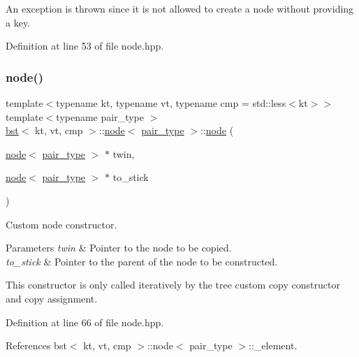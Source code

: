 An exception is thrown since it is not allowed to create a node without providing a key. 

Definition at line 53 of file node.\+hpp.

\mbox{\label{structbst_1_1node_a87b48a3770bbaa16830f8bbb635edd38}} 
\subsubsection{\texorpdfstring{node()}{node()}\hspace{0.1cm}{\footnotesize\ttfamily [2/5]}}
{\footnotesize\ttfamily template$<$typename kt, typename vt, typename cmp = std\+::less$<$kt$>$$>$ \\
template$<$typename pair\+\_\+type $>$ \\
\hyperlink{classbst}{bst}$<$ kt, vt, cmp $>$\+::\hyperlink{structbst_1_1node}{node}$<$ \hyperlink{classbst_a7b11cca2a3b4394915600194f741ab16}{pair\+\_\+type} $>$\+::\hyperlink{structbst_1_1node}{node} (\begin{DoxyParamCaption}\item[{\hyperlink{structbst_1_1node}{node}$<$ \hyperlink{classbst_a7b11cca2a3b4394915600194f741ab16}{pair\+\_\+type} $>$ $\ast$}]{twin,  }\item[{\hyperlink{structbst_1_1node}{node}$<$ \hyperlink{classbst_a7b11cca2a3b4394915600194f741ab16}{pair\+\_\+type} $>$ $\ast$}]{to\+\_\+stick }\end{DoxyParamCaption})\hspace{0.3cm}{\ttfamily [inline]}}



Custom node constructor. 


\begin{DoxyParams}{Parameters}
{\em twin} & Pointer to the node to be copied. \\
\hline
{\em to\+\_\+stick} & Pointer to the parent of the node to be constructed.\\
\hline
\end{DoxyParams}
This constructor is only called iteratively by the tree custom copy constructor and copy assignment. 

Definition at line 66 of file node.\+hpp.



References bst$<$ kt, vt, cmp $>$\+::node$<$ pair\+\_\+type $>$\+::\+\_\+element.

